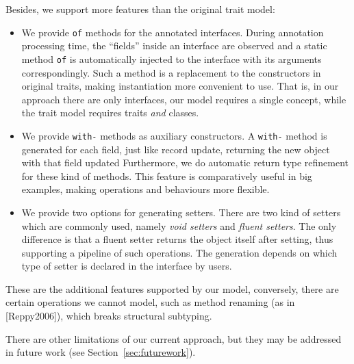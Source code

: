 Besides, we support more features than the original trait model:
\begin{itemize}
\item We provide \texttt{of} methods for the annotated interfaces. During annotation processing time, the ``fields'' inside an interface are observed and a static method \texttt{of} is automatically injected to the interface with its arguments correspondingly. Such a method is a replacement to the constructors in original traits, making instantiation more convenient to use.
That is, in our approach there are only interfaces, our model requires a single concept, while the trait model requires traits \emph{and} classes.

\item We provide \texttt{with-} methods as auxiliary constructors. A \texttt{with-} method is generated for each field, just like record update, returning the new object with that field updated
Furthermore, we do automatic return type refinement for these kind of methods. This feature is comparatively useful in big examples, making operations and behaviours more flexible.%
\item We provide two options for generating setters. There are two kind of setters which are commonly used, namely \textit{void setters} and \textit{fluent setters}. The only difference is that a fluent setter returns the object itself after setting, thus supporting a pipeline of such operations. The generation depends on which type of setter is declared in the interface by users.
\end{itemize}

These are the additional features supported by our model, conversely, there are certain operations we cannot model, such as method renaming (as in [Reppy2006]), which breaks structural subtyping.

There are other limitations of our current approach, but they may be addressed
in future work (see Section~\ref{sec:futurework}).

